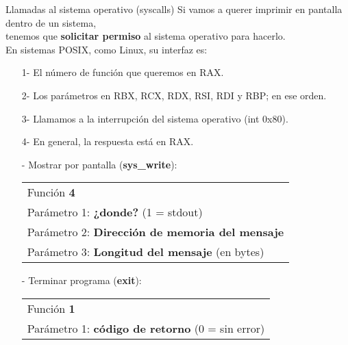 \documentclass[aspectratio=169]{beamer}
\begin{document}
\begin{frame}[fragile]{Llamadas al sistema operativo (syscalls)}
    Si vamos a querer imprimir en pantalla dentro de un sistema,\\
    tenemos que \textbf{solicitar permiso} al sistema operativo para hacerlo.\\
    \bigskip
    \pause
    En sistemas POSIX, como Linux, su interfaz es:
    \small
    \begin{enumerate}
    \item[1-] El número de función que queremos en RAX.
    \item[2-] Los parámetros en RBX, RCX, RDX, RSI, RDI y RBP; en ese orden.
    \item[3-] Llamamos a la interrupción del sistema operativo (int 0x80).
    \item[4-] En general, la respuesta está en RAX.
    \end{enumerate}
    \pause
    \begin{itemize}
    \item[-] \textcolor{verdeuca}{Mostrar por pantalla} (\textbf{sys\_write}):\\
    \begin{tabular}{l}
    Función \textbf{4}\\
    Parámetro 1: \textbf{¿donde?} (1 = stdout)\\
    Parámetro 2: \textbf{Dirección de memoria del mensaje}\\
    Parámetro 3: \textbf{Longitud del mensaje} (en bytes)\\
    \end{tabular}
    \pause
    \item[-] \textcolor{verdeuca}{Terminar programa} (\textbf{exit}):\\
    \begin{tabular}{l}
    Función \textbf{1}\\
    Parámetro 1: \textbf{código de retorno} (0 = sin error)\\
    \end{tabular}
    \end{itemize}
\end{frame}

\newcommand{\A}[0]{\begin{tikzpicture} \draw[white] (0,0) rectangle (.4,.4); \draw[white] (0,0) rectangle (.3,.3);\end{tikzpicture}}
\newcommand{\T}[0]{\begin{tikzpicture} \draw[white] (0,0) rectangle (.4,.4); \draw[red,fill=red] (0,0) rectangle (.3,.3);\end{tikzpicture}}
\newcommand{\R}[0]{\begin{tikzpicture} \draw[white] (0,0) rectangle (.4,.4); \draw[verdeuca,fill=verdeuca] (0,0) rectangle (.3,.3);\end{tikzpicture}}
\newcommand{\B}[0]{\begin{tikzpicture} \draw[white] (0,0) rectangle (.4,.4); \draw[naranjauca,fill=naranjauca] (0,0) rectangle (.3,.3);\end{tikzpicture}}
\end{document}
